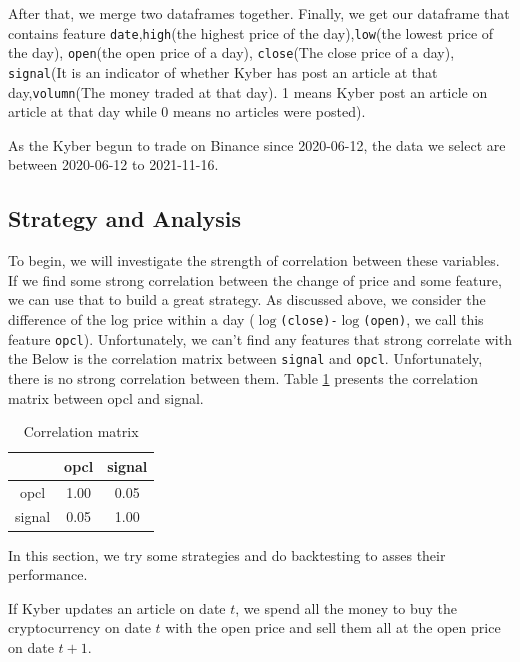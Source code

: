 \documentclass[twoside]{report}
\newcommand{\code}{\texttt}
\begin{document}
\begin{spacing}{1}
After that, we merge two dataframes together. Finally, we get our dataframe that contains feature \code{date},\code{high}(the highest price of the day),\code{low}(the lowest price of the day), \code{open}(the open price of a day), \code{close}(The close price of a day), \code{signal}(It is an indicator of whether Kyber has post an article at that day,\code{volumn}(The money traded at that day). 1 means Kyber post an article on article at that day while 0 means no articles were posted). 

As the Kyber begun to trade on Binance since 2020-06-12, the data we select are between 2020-06-12 to 2021-11-16.




\subsection{Strategy and Analysis}
To begin, we will investigate the strength of correlation between these variables. If we find some strong correlation between the change of price and some feature, we can use that to build a great strategy. As discussed above, we consider the difference of the log price within a day (\code{$\log$(close)-$\log$(open)}, we call this feature \code{opcl}). Unfortunately, we can't find any features that strong correlate with the  Below is the correlation matrix between \code{signal} and \code{opcl}. Unfortunately, there is no strong correlation between them. Table  \ref{tab:corrMatrixOpclSignal} presents the correlation matrix between opcl and signal. 

\begin{table}[]
    \centering
    \begin{tabular}{|c|c|c|}
    \hline
         & opcl &  signal \\ \hline
        opcl & 1.00 & 0.05\\ \hline
        signal & 0.05& 1.00\\ \hline
    \end{tabular}
    \caption{Correlation matrix}
    \label{tab:corrMatrixOpclSignal}
\end{table}


In this section, we try some strategies and do backtesting to asses their performance. 

\begin{strategy}
If Kyber updates an article on date $t$, we spend all the money to buy the cryptocurrency on date $t$ with the open price and sell them all at the open price on date $t+1$.
\end{strategy}\label{strat:Kyber1}


\end{spacing}
\end{document}
